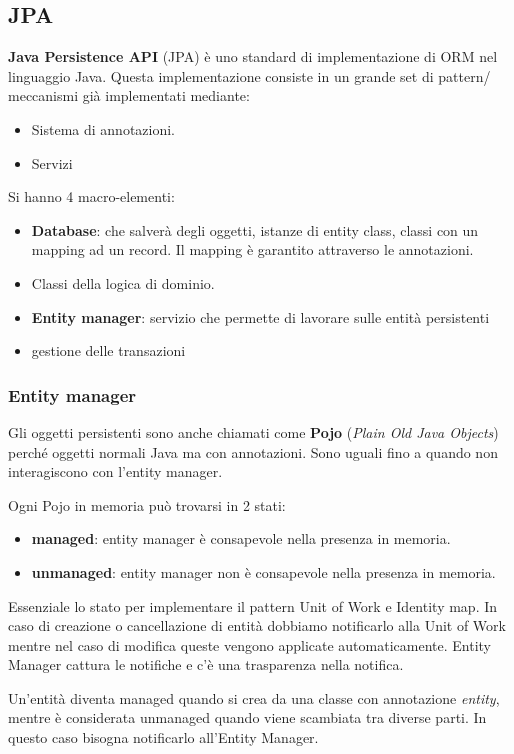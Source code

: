 \subsection{JPA}
\textbf{Java Persistence API} (JPA) è uno standard di implementazione di ORM nel
linguaggio Java. Questa implementazione consiste in un grande set di pattern/
meccanismi già implementati mediante:
\begin{itemize}
      \item Sistema di annotazioni.
      \item Servizi
\end{itemize}
Si hanno 4 macro-elementi:
\begin{itemize}
      \item \textbf{Database}: che salverà degli oggetti, istanze di entity class,
            classi con un mapping ad un record. Il mapping è garantito attraverso
            le annotazioni.
      \item Classi della logica di dominio.
      \item \textbf{Entity manager}: servizio che permette di lavorare sulle entità
            persistenti
      \item gestione delle transazioni
\end{itemize}
\subsubsection{Entity manager}
Gli oggetti persistenti sono anche chiamati come \textbf{Pojo} (\textit{Plain Old
      Java Objects}) perché oggetti normali Java ma con annotazioni. Sono uguali
fino a quando non interagiscono con l'entity manager.

Ogni Pojo in memoria può trovarsi in 2 stati:
\begin{itemize}
      \item \textbf{managed}: entity manager è consapevole nella presenza in
            memoria.
      \item \textbf{unmanaged}: entity manager non è consapevole nella presenza
            in memoria.
\end{itemize}
Essenziale lo stato per implementare il pattern Unit of Work e Identity map.
In caso di creazione o cancellazione di entità dobbiamo notificarlo alla Unit of
Work mentre nel caso di modifica queste vengono applicate automaticamente.
Entity Manager cattura le notifiche e c'è una trasparenza nella notifica.

Un'entità diventa managed quando si crea da una classe con annotazione
\textit{entity}, mentre è considerata unmanaged quando viene scambiata tra diverse
parti. In questo caso bisogna notificarlo all'Entity Manager.


